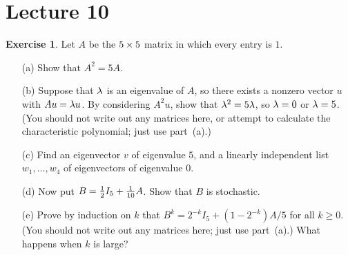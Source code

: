 \documentclass[a4paper]{amsart}
\theoremstyle{definition}
\newtheorem{exercise}{Exercise}
\begin{document}
\section{Lecture 10}

\begin{exercise}\label{ex-powers-i}
 Let $A$ be the $5\times 5$ matrix in which every entry is $1$.
 \begin{itemize}
  \item[(a)] Show that $A^2=5A$.
  \item[(b)] Suppose that $\lambda$ is an eigenvalue of $A$, so there
   exists a nonzero vector $u$ with $Au=\lambda u$.  By considering
   $A^2u$, show that $\lambda^2=5\lambda$, so $\lambda=0$ or $\lambda=5$. (You should
   not write out any matrices here, or attempt to calculate the
   characteristic polynomial; just use part~(a).)
  \item[(c)] Find an eigenvector $v$ of eigenvalue $5$, and a linearly
   independent list $w_1,\dotsc,w_4$ of eigenvectors of eigenvalue
   $0$.
  \item[(d)] Now put $B=\tfrac{1}{2} I_5 + \tfrac{1}{10}A$.  Show that $B$ is
   stochastic.
  \item[(e)] Prove by induction on $k$ that
   $B^k=2^{-k}I_5+(1-2^{-k})A/5$ for all $k\geq 0$.  (You should not
   write out any matrices here; just use part~(a).)  What happens when
   $k$ is large?
 \end{itemize}
\end{exercise}
\end{document}
